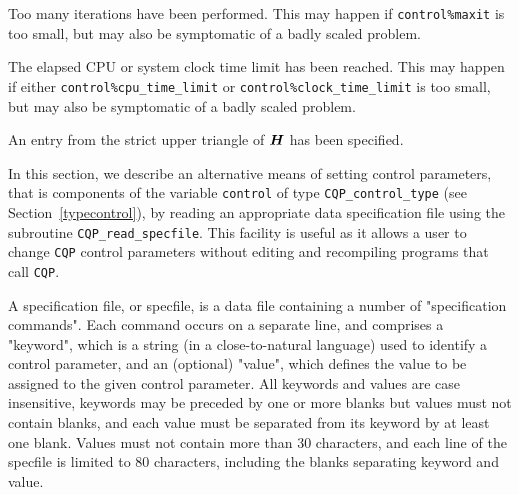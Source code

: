 \documentclass{galahad}
\newcommand{\packagename}{CQP}
\begin{document}
\begin{description}
 Too many iterations have been performed.
   This may happen if
    {\tt control\%maxit} is too small, but may also be symptomatic of
    a badly scaled problem.

 The elapsed CPU or system clock time limit has been
    reached. This may happen if either {\tt control\%cpu\_time\_limit} or
    {\tt control\%clock\_time\_limit} is too small, but may also be symptomatic
    of a badly scaled problem.

 An entry from the strict upper triangle of ${\bm{H}}$
 has been specified.

\end{description}


\galfeatures
\noindent In this section, we describe an alternative means of setting
control parameters, that is components of the variable {\tt control} of type
{\tt \packagename\_control\_type}
(see Section~\ref{typecontrol}),
by reading an appropriate data specification file using the
subroutine {\tt \packagename\_read\_specfile}. This facility
is useful as it allows a user to change  {\tt \packagename} control parameters
without editing and recompiling programs that call {\tt \packagename}.

A specification file, or specfile, is a data file containing a number of
"specification commands". Each command occurs on a separate line,
and comprises a "keyword",
which is a string (in a close-to-natural language) used to identify a
control parameter, and
an (optional) "value", which defines the value to be assigned to the given
control parameter. All keywords and values are case insensitive,
keywords may be preceded by one or more blanks but
values must not contain blanks, and
each value must be separated from its keyword by at least one blank.
Values must not contain more than 30 characters, and
each line of the specfile is limited to 80 characters,
including the blanks separating keyword and value.
\end{document}
